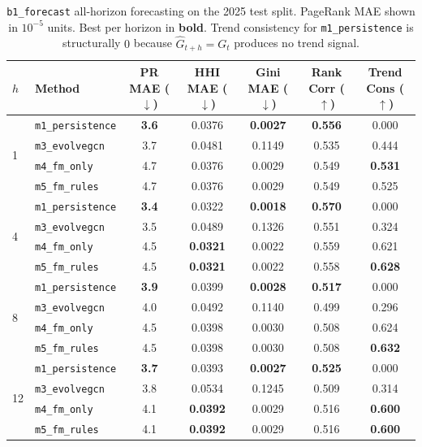 \begin{table}[!htbp]
\centering
\footnotesize
\setlength{\tabcolsep}{4pt}
\caption{\texttt{b1\_forecast} all-horizon forecasting on the 2025 test split.
PageRank MAE shown in $10^{-5}$ units. Best per horizon in \textbf{bold}.
Trend consistency for \texttt{m1\_persistence} is structurally $0$ because
$\hat G_{t+h}=G_t$ produces no trend signal.}
\label{tab:b1_all_horizons}
\begin{tabular}{l l c c c c c}
\toprule
$h$ & Method & PR MAE ($\downarrow$) & HHI MAE ($\downarrow$) & Gini MAE ($\downarrow$) & Rank Corr ($\uparrow$) & Trend Cons ($\uparrow$) \\
\midrule
\multirow{4}{*}{1}
& \texttt{m1\_persistence} & \textbf{3.6} & 0.0376 & \textbf{0.0027} & \textbf{0.556} & 0.000 \\
& \texttt{m3\_evolvegcn}   & 3.7          & 0.0481 & 0.1149          & 0.535          & 0.444 \\
& \texttt{m4\_fm\_only}    & 4.7          & 0.0376 & 0.0029          & 0.549          & \textbf{0.531} \\
& \texttt{m5\_fm\_rules}   & 4.7          & 0.0376 & 0.0029          & 0.549          & 0.525 \\
\midrule
\multirow{4}{*}{4}
& \texttt{m1\_persistence} & \textbf{3.4} & 0.0322 & \textbf{0.0018} & \textbf{0.570} & 0.000 \\
& \texttt{m3\_evolvegcn}   & 3.5          & 0.0489 & 0.1326          & 0.551          & 0.324 \\
& \texttt{m4\_fm\_only}    & 4.5          & \textbf{0.0321} & 0.0022 & 0.559          & 0.621 \\
& \texttt{m5\_fm\_rules}   & 4.5          & \textbf{0.0321} & 0.0022 & 0.558          & \textbf{0.628} \\
\midrule
\multirow{4}{*}{8}
& \texttt{m1\_persistence} & \textbf{3.9} & 0.0399 & \textbf{0.0028} & \textbf{0.517} & 0.000 \\
& \texttt{m3\_evolvegcn}   & 4.0          & 0.0492 & 0.1140          & 0.499          & 0.296 \\
& \texttt{m4\_fm\_only}    & 4.5          & 0.0398 & 0.0030          & 0.508          & 0.624 \\
& \texttt{m5\_fm\_rules}   & 4.5          & 0.0398 & 0.0030          & 0.508          & \textbf{0.632} \\
\midrule
\multirow{4}{*}{12}
& \texttt{m1\_persistence} & \textbf{3.7} & 0.0393 & \textbf{0.0027} & \textbf{0.525} & 0.000 \\
& \texttt{m3\_evolvegcn}   & 3.8          & 0.0534 & 0.1245          & 0.509          & 0.314 \\
& \texttt{m4\_fm\_only}    & 4.1          & \textbf{0.0392} & 0.0029 & 0.516          & \textbf{0.600} \\
& \texttt{m5\_fm\_rules}   & 4.1          & \textbf{0.0392} & 0.0029 & 0.516          & \textbf{0.600} \\
\bottomrule
\end{tabular}
\end{table}

